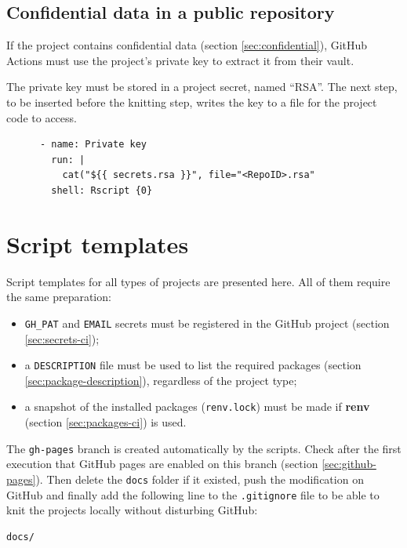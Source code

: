 \documentclass[
  12pt,
  american,
  a4paper,
  extrafontsizes,onecolumn,openright
  ]{memoir}
\providecommand{\tightlist}{%
  \setlength{\itemsep}{0pt}\setlength{\parskip}{0pt}}
\begin{document}
\hypertarget{sec:confidentielCI}{%
\subsection{Confidential data in a public repository}\label{sec:confidentielCI}}

If the project contains confidential data (section \ref{sec:confidential}), GitHub Actions must use the project's private key to extract it from their vault.

The private key must be stored in a project secret, named \enquote{RSA}.
The next step, to be inserted before the knitting step, writes the key to a file for the project code to access.

\begin{verbatim}
      - name: Private key
        run: |
          cat("${{ secrets.rsa }}", file="<RepoID>.rsa"
        shell: Rscript {0}
\end{verbatim}

\hypertarget{script-templates}{%
\section{Script templates}\label{script-templates}}

Script templates for all types of projects are presented here.
All of them require the same preparation:

\begin{itemize}
\tightlist
\item
  \texttt{GH\_PAT} and \texttt{EMAIL} secrets must be registered in the GitHub project (section \ref{sec:secrets-ci});
\item
  a \texttt{DESCRIPTION} file must be used to list the required packages (section \ref{sec:package-description}), regardless of the project type;
\item
  a snapshot of the installed packages (\texttt{renv.lock}) must be made if \textbf{renv} (section \ref{sec:packages-ci}) is used.
\end{itemize}

The \texttt{gh-pages} branch is created automatically by the scripts.
Check after the first execution that GitHub pages are enabled on this branch (section \ref{sec:github-pages}).
Then delete the \texttt{docs} folder if it existed, push the modification on GitHub and finally add the following line to the \texttt{.gitignore} file to be able to knit the projects locally without disturbing GitHub:

\begin{verbatim}
docs/
\end{verbatim}
\end{document}
